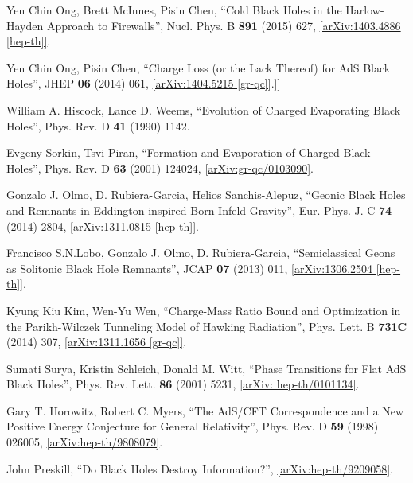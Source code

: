 \documentclass[12pt]{article}
\newcommand{\2}{$^2$}
\newcommand{\3}{$^3$}
\newcommand{\4}{$_4$}
\newcommand{\5}{$_5$}
\newcommand{\x}{arXiv:}
\begin{document}
\begin{thebibliography}{400}
Yen Chin Ong, Brett McInnes, Pisin Chen, ``Cold Black Holes in the Harlow-Hayden Approach to Firewalls'', Nucl. Phys. B \textbf{891} (2015) 627, \href{http://arxiv.org/abs/1403.4886}{[arXiv:1403.4886 [hep-th]]}.

Yen Chin Ong, Pisin Chen, ``Charge Loss (or the Lack Thereof) for AdS Black Holes'', JHEP \textbf{06} (2014) 061, \href{http://arxiv.org/abs/1404.5215}{[arXiv:1404.5215 [gr-qc]]}.]]

William A. Hiscock, Lance D. Weems,
``Evolution of Charged Evaporating Black Holes'', Phys. Rev. D \textbf{41} (1990) 1142.

Evgeny Sorkin, Tsvi Piran,
``Formation and Evaporation of Charged Black Holes'', Phys. Rev. D \textbf{63} (2001) 124024, \href{http://arxiv.org/abs/gr-qc/0103090v1}{[arXiv:gr-qc/0103090]}.

Gonzalo J. Olmo, D. Rubiera-Garcia, Helios Sanchis-Alepuz, ``Geonic Black Holes and Remnants in Eddington-inspired Born-Infeld Gravity'', 	Eur. Phys. J. C \textbf{74} (2014) 2804, \href{http://arxiv.org/abs/1311.0815}{[arXiv:1311.0815 [hep-th]]}.

Francisco S.N.Lobo, Gonzalo J. Olmo, D. Rubiera-Garcia, ``Semiclassical Geons as Solitonic Black Hole Remnants'', JCAP \textbf{07} (2013) 011, \href{http://arxiv.org/abs/1306.2504}{[arXiv:1306.2504 [hep-th]]}.

Kyung Kiu Kim, Wen-Yu Wen, ``Charge-Mass Ratio Bound and Optimization in the Parikh-Wilczek Tunneling Model of Hawking Radiation'', Phys. Lett. B \textbf{731C} (2014) 307,  \href{http://arxiv.org/abs/1311.1656}{[arXiv:1311.1656 [gr-qc]]}.

Sumati Surya, Kristin Schleich, Donald M. Witt, ``Phase Transitions
for Flat AdS Black Holes'', Phys. Rev. Lett. \textbf{86} (2001) 5231, \href{http://arxiv.org/abs/hep-th/0101134}{[\x
hep-th/0101134]}.

Gary T. Horowitz, Robert C. Myers, ``The AdS/CFT Correspondence and a New Positive Energy Conjecture for General Relativity'',
Phys. Rev. D \textbf{59} (1998) 026005, \href{http://arxiv.org/abs/hep-th/9808079}{[\x hep-th/9808079]}.









John Preskill, ``Do Black Holes Destroy Information?'', \href{http://arxiv.org/abs/hep-th/9209058}{[arXiv:hep-th/9209058]}.


\end{thebibliography}
\end{document}
